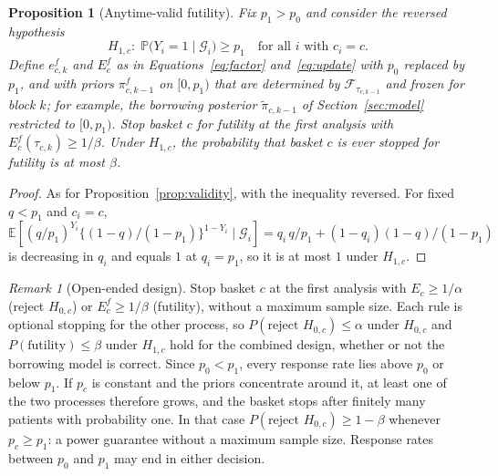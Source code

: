 \documentclass[11pt,a4paper]{article}
\newtheorem{proposition}{Proposition}
\theoremstyle{definition}
\theoremstyle{remark}
\newtheorem{remark}{Remark}
\newcommand{\F}{\mathcal{F}}
\newcommand{\G}{\mathcal{G}}
\newcommand{\E}{\mathbb{E}}
\renewcommand{\P}{\mathbb{P}}
\begin{document}
\begin{proposition}[Anytime-valid futility]\label{prop:futility}
Fix $p_1>p_0$ and consider the reversed hypothesis
\begin{equation}\label{eq:h1}
  H_{1,c}\colon\; \P\big(Y_i = 1 \mid \G_i\big) \ge p_1 \quad \text{for all } i \text{ with } c_i = c .
\end{equation}
Define $e^{f}_{c,k}$ and $E^{f}_c$ as in Equations~\eqref{eq:factor} and~\eqref{eq:update} with $p_0$ replaced by $p_1$, and with priors $\pi^{f}_{c,k-1}$ on $[0,p_1)$ that are determined by $\F_{\tau_{c,k-1}}$ and frozen for block $k$; for example, the borrowing posterior $\tilde\pi_{c,k-1}$ of Section~\ref{sec:model} restricted to $[0,p_1)$.
Stop basket $c$ for futility at the first analysis with $E^{f}_c(\tau_{c,k}) \ge 1/\beta$.
Under $H_{1,c}$, the probability that basket $c$ is ever stopped for futility is at most $\beta$.
\end{proposition}

\begin{proof}
As for Proposition~\ref{prop:validity}, with the inequality reversed.
For fixed $q<p_1$ and $c_i=c$,
$\E[(q/p_1)^{Y_i}\{(1-q)/(1-p_1)\}^{1-Y_i}\mid\G_i] = q_i\, q/p_1 + (1-q_i)(1-q)/(1-p_1)$
is decreasing in $q_i$ and equals $1$ at $q_i=p_1$, so it is at most $1$ under $H_{1,c}$.
\end{proof}

\begin{remark}[Open-ended design]\label{rem:open-design}
Stop basket $c$ at the first analysis with $E_c \ge 1/\alpha$ (reject $H_{0,c}$) or $E^{f}_c \ge 1/\beta$ (futility), without a maximum sample size.
Each rule is optional stopping for the other process, so $P(\text{reject } H_{0,c}) \le \alpha$ under $H_{0,c}$ and $P(\text{futility}) \le \beta$ under $H_{1,c}$ hold for the combined design, whether or not the borrowing model is correct.
Since $p_0<p_1$, every response rate lies above $p_0$ or below $p_1$.
If $p_c$ is constant and the priors concentrate around it, at least one of the two processes therefore grows, and the basket stops after finitely many patients with probability one.
In that case $P(\text{reject } H_{0,c}) \ge 1-\beta$ whenever $p_c \ge p_1$: a power guarantee without a maximum sample size.
Response rates between $p_0$ and $p_1$ may end in either decision.
\end{remark}
\end{document}
